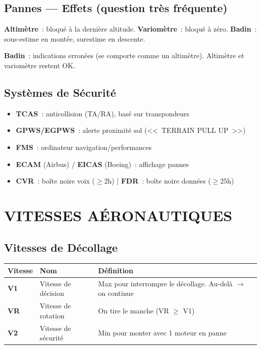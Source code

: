 \documentclass[11pt,a4paper]{article}
\begin{document}
\subsection{Pannes --- Effets (question très fréquente)}

\begin{warnbox}[title=\textbf{Si la prise STATIQUE est bouchée}]
\textbf{Altimètre}~: bloqué à la dernière altitude.
\textbf{Variomètre}~: bloqué à zéro.
\textbf{Badin}~: sous-estime en montée, surestime en descente.
\end{warnbox}

\begin{warnbox}[title=\textbf{Si le tube PITOT est bouché}]
\textbf{Badin}~: indications erronées (se comporte comme un altimètre). Altimètre et variomètre restent OK.
\end{warnbox}

\subsection{Systèmes de Sécurité}
\begin{itemize}[nosep]
\item \textbf{TCAS}~: anticollision (TA/RA), basé sur transpondeurs
\item \textbf{GPWS/EGPWS}~: alerte proximité sol (<<~TERRAIN PULL UP~>>)
\item \textbf{FMS}~: ordinateur navigation/performances
\item \textbf{ECAM} (Airbus) / \textbf{EICAS} (Boeing)~: affichage pannes
\item \textbf{CVR}~: boîte noire voix ($\geq$2h) | \textbf{FDR}~: boîte noire données ($\geq$25h)
\end{itemize}

\section{VITESSES AÉRONAUTIQUES}

\subsection{Vitesses de Décollage}

\begin{tabular}{p{2cm}p{4cm}p{8.5cm}}
\toprule
\textbf{Vitesse} & \textbf{Nom} & \textbf{Définition} \\
\midrule
\textbf{V1} & Vitesse de décision & Max pour interrompre le décollage. Au-delà $\to$ on continue \\
\textbf{VR} & Vitesse de rotation & On tire le manche (VR $\geq$ V1) \\
\textbf{V2} & Vitesse de sécurité & Min pour monter avec 1 moteur en panne \\
\bottomrule
\end{tabular}
\end{document}
